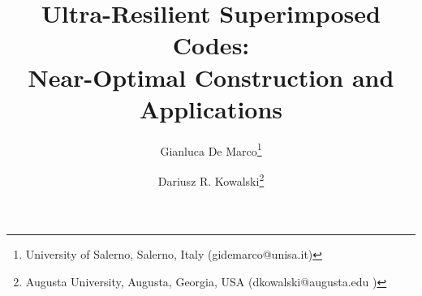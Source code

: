 \documentclass[11pt]{article}
\begin{document}
\title{Ultra-Resilient Superimposed Codes:\\ Near-Optimal Construction and Applications}

\newtheorem{lemma}{Lemma}
\newtheorem{theorem}{Theorem}
\newtheorem{esempio}{Example}
\newtheorem{corollary}{Corollary}
\newtheorem{proposition}{Proposition}
\newtheorem{example}{Example}[section] 
\newtheorem{definition}{Definition}
\newtheorem{claim}{Claim}


\newcommand{\remove}[1]{}
\newcommand{\x}{{\bf x}}
\newcommand{\bc}{{\mathbf  c}}
\newcommand{\bd}{{\mathbf  d}}
\newcommand{\be}{{\mathbf  e}}
\newcommand{\bg}{{\mathbf  g}}
\newcommand{\bx}{{\mathbf  x}}
\newcommand{\by}{{\mathbf  y}}
\newcommand{\bb}{{\mathbf  b}}
\newcommand{\bz}{{\mathbf  z}}
\newcommand{\M}{{\mathbf  M}}
\newcommand{\pairCondition}{$\mathcal{P} (\mathbf{M}, \alpha, \tau_1, \tau_2)$}
\newcommand{\elongation}{elongation}

\newcommand{\B}{\vspace*{-2.5ex}}

\newcommand{\cS}{{\cal S}}
\newcommand{\cA}{{\cal A}}
\newcommand{\cM}{{\mathcal{M}}}

\newcommand{\gdm}[1]{{\color{black}{#1}}}

\newcommand{\dk}[1]{{\color{black}{#1}}}
\newcommand{\gia}[1]{{\color{black}{#1}}}

\newcommand{\uv}[1]{{\color{black}{#1}}}

\newtheorem{fact}{Fact}

\makeatletter

\newcommand{\newreptheorem}[2]{\newenvironment{rep#1}[1]{\def\rep@title{#2 \ref{##1}}\begin{rep@theorem}}{\end{rep@theorem}}}
\makeatother








\date{}




\author{
	Gianluca De Marco\thanks{University of Salerno, Salerno, Italy
		({gidemarco@unisa.it})}
	\and Dariusz R. Kowalski\thanks{Augusta University, Augusta, Georgia, USA
		({dkowalski@augusta.edu })}
}
\end{document}
